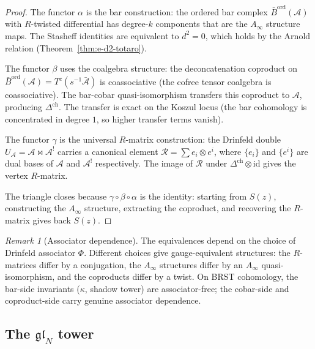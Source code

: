\documentclass[11pt,reqno]{amsart}
\theoremstyle{definition}
\theoremstyle{remark}
\newtheorem{remark}[theorem]{Remark}
\providecommand{\cA}{\mathcal{A}}
\providecommand{\Ainf}{A_\infty}
\providecommand{\Barord}{\bar{B}^{\mathrm{ord}}}
\providecommand{\id}{\mathrm{id}}
\providecommand{\cR}{\mathcal{R}}
\begin{document}
\begin{proof}
The functor $\alpha$ is the bar construction: the ordered bar
complex $\Barord(\cA)$ with $R$-twisted differential has
degree-$k$ components that are the $\Ainf$ structure maps. The
Stasheff identities are equivalent to $d^2 = 0$, which holds
by the Arnold relation (Theorem~\ref{thm:e-d2-totaro}).

The functor $\beta$ uses the coalgebra structure: the
deconcatenation coproduct on $\Barord(\cA) = T^c(s^{-1}\bar{\cA})$
is coassociative (the cofree tensor coalgebra is
coassociative). The bar-cobar quasi-isomorphism transfers
this coproduct to $\cA$, producing $\Delta^{\mathrm{ch}}$.
The transfer is exact on the Koszul locus (the bar
cohomology is concentrated in degree $1$, so higher transfer
terms vanish).

The functor $\gamma$ is the universal $R$-matrix construction:
the Drinfeld double
$U_\cA = \cA \bowtie \cA^!$ carries a canonical element
$\cR = \sum e_i \otimes e^i$, where $\{e_i\}$ and $\{e^i\}$
are dual bases of $\cA$ and $\cA^!$ respectively. The image of
$\cR$ under $\Delta^{\mathrm{ch}} \otimes \id$ gives the
vertex $R$-matrix.

The triangle closes because $\gamma \circ \beta \circ \alpha$
is the identity: starting from $S(z)$, constructing the $\Ainf$
structure, extracting the coproduct, and recovering the
$R$-matrix gives back $S(z)$.
\end{proof}

\begin{remark}[Associator dependence]
\label{rem:e-associator-dependence}
The equivalences depend on the choice of Drinfeld associator
$\Phi$. Different choices give gauge-equivalent structures:
the $R$-matrices differ by a conjugation, the $\Ainf$
structures differ by an $\Ainf$ quasi-isomorphism, and the
coproducts differ by a twist. On BRST cohomology, the
bar-side invariants ($\kappa$, shadow tower) are
associator-free; the cobar-side and coproduct-side carry
genuine associator dependence.
\end{remark}

\subsection{The $\mathfrak{gl}_N$ tower}
\end{document}
